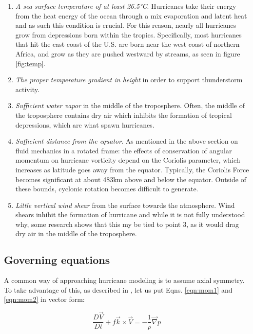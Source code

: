 \begin{enumerate}
    \item \textit{A sea surface temperature of at least 26.5°C}. Hurricanes take their energy from the heat energy of the ocean through a mix evaporation and latent heat and as such this condition is crucial. For this reason, nearly all hurricanes grow from depressions born within the tropics. Specifically, most hurricanes that hit the east coast of the U.S. are born near the west coast of northern Africa, and grow as they are pushed westward by streams, as seen in figure \ref{fig:temp}. \cite{develop}
    \item \textit{The proper temperature gradient in height} in order to support thunderstorm activity. \cite{develop}
    \item \textit{Sufficient water vapor} in the middle of the troposphere. Often, the middle of the troposphere contains dry air which inhibits the formation of tropical depressions, which are what spawn hurricanes. \cite{develop}
    \item \textit{Sufficient distance from the equator}. As mentioned in the above section on fluid mechanics in a rotated frame: the effects of conservation of angular momentum on hurricane vorticity depend on the Coriolis parameter, which increases as latitude goes away from the equator. Typically, the Coriolis Force becomes significant at about 483km above and below the equator. Outside of these bounds, cyclonic rotation becomes difficult to generate. \cite{develop}
    \item \textit{Little vertical wind shear} from the surface towards the atmosphere. Wind shears inhibit the formation of hurricane and while it is not fully understood why, some research shows that this my be tied to point 3, as it would drag dry air in the middle of the troposphere.
\end{enumerate}


\subsection{Governing equations}

A common way of approaching hurricane modeling is to assume axial symmetry. To take advantage of this, as described in \cite{holton_hakim_2019}, let us put Eqns. \ref{eqn:mom1} and \ref{eqn:mom2} in vector form:

\begin{equation}
    \frac{D\vec{V}}{Dt}+f\vec{k}\times\vec{V}=-\frac{1}{\rho}\vec{\nabla}p
\end{equation}


